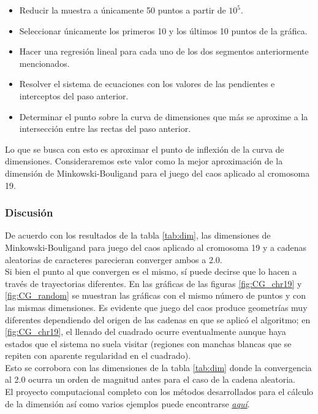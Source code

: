 \documentclass[letterpaper,12pt,oneside]{book}
\begin{document}
\begin{itemize}
    \item Reducir la muestra a únicamente 50 puntos a partir de $10^{5}$.
    \item Seleccionar únicamente los primeros 10 y los últimos 10 puntos de la gráfica.
    \item Hacer una regresión lineal para cada uno de los dos segmentos anteriormente mencionados.
    \item Resolver el sistema de ecuaciones con los valores de las pendientes e interceptos del paso anterior.
    \item Determinar el punto sobre la curva de dimensiones que más se aproxime a la intersección entre las rectas del paso anterior.
\end{itemize}

Lo que se busca con esto es aproximar el punto de inflexión de la curva de dimensiones. Consideraremos este valor como la mejor aproximación de la dimensión de Minkowski-Bouligand para el juego del caos aplicado al cromosoma 19.


\subsubsection{Discusión}

De acuerdo con los resultados de la tabla \ref{tab:dim}, las dimensiones de Minkowski-Bouligand para juego del caos aplicado al cromosoma 19 y a cadenas aleatorias de caracteres parecieran converger ambos a 2.0.
\\

Si bien el punto al que convergen es el mismo, sí puede decirse que lo hacen a través de trayectorias diferentes. 
En las gráficas de las figuras \ref{fig:CG_chr19} y \ref{fig:CG_random} se muestran las gráficas con el mismo número de puntos y con las mismas dimensiones. Es evidente que juego del caos produce geometrías muy diferentes dependiendo del origen de las cadenas en que se aplicó el algoritmo; en \ref{fig:CG_chr19}, el llenado del cuadrado ocurre eventualmente aunque haya estados que el sistema no suela visitar (regiones con manchas blancas que se repiten con aparente regularidad en el cuadrado).
\\

Esto se corrobora con las dimensiones de la tabla \ref{tab:dim} donde la convergencia al 2.0 ocurra un orden de magnitud antes para el caso de la cadena aleatoria.
\\

El proyecto computacional completo con los métodos desarrollados para el cálculo de la dimensión así como varios ejemplos puede encontrarse \href{https://github.com/RobertoBastida/ChaosGame_DNA}{\emph{aquí}}. 
\end{document}
